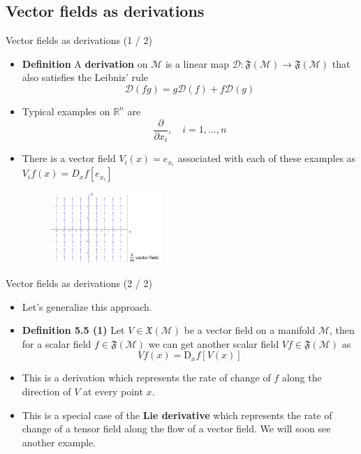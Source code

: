 \documentclass{beamer}
\begin{document}
\subsection{Vector fields as derivations}
\begin{frame}{Vector fields as derivations (1 / 2)}
    \begin{itemize}
        \item \textbf{Definition} A {\color{blue}\textbf{derivation}} on $\mathcal{M}$ is a linear map $\mathcal{D} : \mathfrak{F}(\mathcal{M}) \to \mathfrak{F}(\mathcal{M})$ that also satisfies the Leibniz' rule 
        \begin{equation}
            \mathcal{D}(fg) = g \mathcal{D}(f) + f \mathcal{D}(g)    
        \end{equation}
    \end{itemize}
    \begin{itemize}
        \item Typical examples on $\mathbb{R}^{n}$ are 
        \begin{equation}
            \frac{\partial}{\partial x_i}, \quad i = 1, ..., n 
        \end{equation}
        \item There is a vector field $V_i(x) = e_{x_i}$ associated with each of these examples as $V_i f(x) = D_x f[e_{x_i}]$
        \begin{figure}[h!]
            \includegraphics[width=0.4\textwidth]{images/partial_y_vector_field.png}
        \end{figure}
    \end{itemize}
    
\end{frame}
\begin{frame}{Vector fields as derivations (2 / 2)}
    \begin{itemize}
        \item Let's generalize this approach. 
        \item \textbf{Definition 5.5 (1)} Let $V \in \mathfrak{X}(\mathcal{M})$ be a vector field on a manifold $\mathcal{M}$, then for a scalar field $f \in \mathfrak{F}(\mathcal{M})$ we can get another scalar field $Vf \in \mathfrak{F}(\mathcal{M})$ as 
        \begin{equation}
            Vf(x) = \text{D}_{x}f[V(x)]
        \end{equation}
        \item This is a derivation which represents the rate of change of $f$ along the direction of $V$ at every point $x$. 
        \item This is a special case of the \textbf{Lie derivative} which represents the rate of change of a tensor field along the flow of a vector field. We will soon see another example. 
    \end{itemize}
\end{frame}
\end{document}
